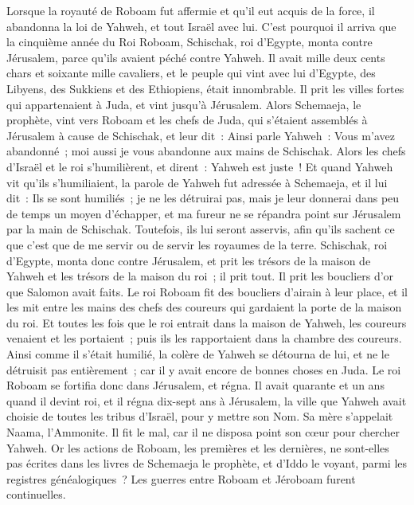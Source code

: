 \begin{multicols}{2}
\VerseOne{}Lorsque la royauté de Roboam fut affermie et qu'il eut acquis de la force, il abandonna la loi de Yahweh, et tout Israël avec lui.
C'est pourquoi il arriva que la cinquième année du Roi Roboam, Schischak, roi d'Egypte, monta contre Jérusalem, parce qu'ils avaient péché contre Yahweh.
Il avait mille deux cents chars et soixante mille cavaliers, et le peuple qui vint avec lui d'Egypte, des Libyens, des Sukkiens et des Ethiopiens, était innombrable.
Il prit les villes fortes qui appartenaient à Juda, et vint jusqu'à Jérusalem.
Alors Schemaeja, le prophète, vint vers Roboam et les chefs de Juda, qui s'étaient assemblés à Jérusalem à cause de Schischak, et leur dit~: Ainsi parle Yahweh~: Vous m'avez abandonné~; moi aussi je vous abandonne aux mains de Schischak.
Alors les chefs d'Israël et le roi s'humilièrent, et dirent~: Yahweh est juste~!
Et quand Yahweh vit qu'ils s'humiliaient, la parole de Yahweh fut adressée à Schemaeja, et il lui dit~: Ils se sont humiliés~; je ne les détruirai pas, mais je leur donnerai dans peu de temps un moyen d'échapper, et ma fureur ne se répandra point sur Jérusalem par la main de Schischak.
Toutefois, ils lui seront asservis, afin qu'ils sachent ce que c'est que de me servir ou de servir les royaumes de la terre.
Schischak, roi d'Egypte, monta donc contre Jérusalem, et prit les trésors de la maison de Yahweh et les trésors de la maison du roi~; il prit tout. Il prit les boucliers d'or que Salomon avait faits.
Le roi Roboam fit des boucliers d'airain à leur place, et il les mit entre les mains des chefs des coureurs qui gardaient la porte de la maison du roi.
Et toutes les fois que le roi entrait dans la maison de Yahweh, les coureurs venaient et les portaient~; puis ils les rapportaient dans la chambre des coureurs.
Ainsi comme il s'était humilié, la colère de Yahweh se détourna de lui, et ne le détruisit pas entièrement~; car il y avait encore de bonnes choses en Juda.
Le roi Roboam se fortifia donc dans Jérusalem, et régna. Il avait quarante et un ans quand il devint roi, et il régna dix-sept ans à Jérusalem, la ville que Yahweh avait choisie de toutes les tribus d'Israël, pour y mettre son Nom. Sa mère s'appelait Naama, l'Ammonite.
Il fit le mal, car il ne disposa point son cœur pour chercher Yahweh.
Or les actions de Roboam, les premières et les dernières, ne sont-elles pas écrites dans les livres de Schemaeja le prophète, et d'Iddo le voyant, parmi les registres généalogiques~? Les guerres entre Roboam et Jéroboam furent continuelles.

\end{multicols}
